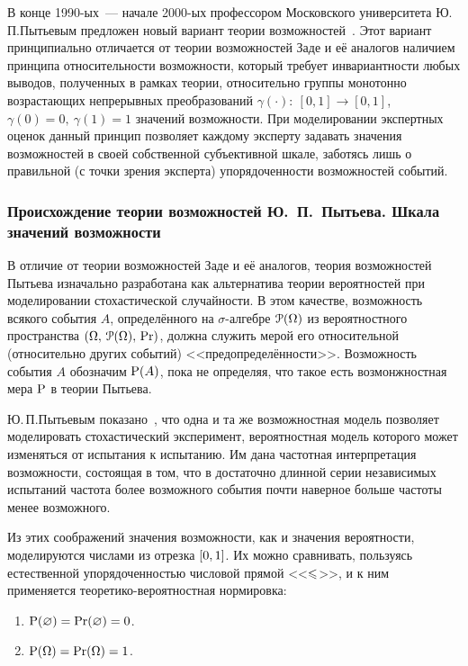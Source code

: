 В конце 1990-ых~--- начале 2000-ых профессором Московского университета Ю.\,П.\;Пытьевым предложен новый вариант теории возможностей~\cite{possbook, cit:smf, probbook, pytyev_experts}. Этот вариант принципиально отличается от теории возможностей Заде и её аналогов наличием принципа относительности возможности, который требует инвариантности любых выводов, полученных в рамках теории, относительно группы монотонно возрастающих непрерывных преобразований $\gamma(\cdot):\ [0,1]\to[0,1]$, $\gamma(0) = 0,\ \gamma(1) = 1$ значений возможности. При моделировании экспертных оценок данный принцип позволяет каждому эксперту задавать значения возможностей в своей собственной субъективной шкале, заботясь лишь о правильной (с точки зрения эксперта) упорядоченности возможностей событий.

\subsubsection{Происхождение теории возможностей Ю.~П.~Пытьева. Шкала значений возможности}

В отличие от теории возможностей Заде и её аналогов, теория возможностей Пытьева изначально разработана как альтернатива теории вероятностей при моделировании стохастической случайности.  В этом качестве, возможность всякого события $A$, определённого на $\sigma$-алгебре $\Po(\Omega)$ из вероятностного пространства $\OAPr$, должна служить мерой его относительной (относительно других событий) <<предопределённости>>. Возможность события $A$ обозначим $\P(A)$, пока не определяя, что такое есть возмонжностная мера $\P$ в теории Пытьева. 
\begin{notice}
Ю.\,П.\;Пытьевым показано~\cite{possbook2}, что одна и та же возможностная модель позволяет моделировать стохастический эксперимент, вероятностная модель которого может изменяться от испытания к испытанию.  Им дана частотная интерпретация возможности, состоящая в том, что в достаточно длинной серии независимых испытаний частота более возможного события почти наверное больше частоты менее возможного. 
\end{notice}

Из этих соображений значения возможности,  как и значения вероятности, моделируются числами из отрезка $\zo$. Их можно сравнивать, пользуясь естественной упорядоченностью числовой прямой <<$\leqs$>>, и к ним применяется теоретико-вероятностная нормировка:
\begin{enumerate}
\item\label{item_poss_rel_1}
    $\P(\varnothing) = \Pr(\varnothing) = 0$.
\item\label{item_poss_rel_2}
    $\P(\Omega) = \Pr(\Omega) = 1$.
\end{enumerate}

